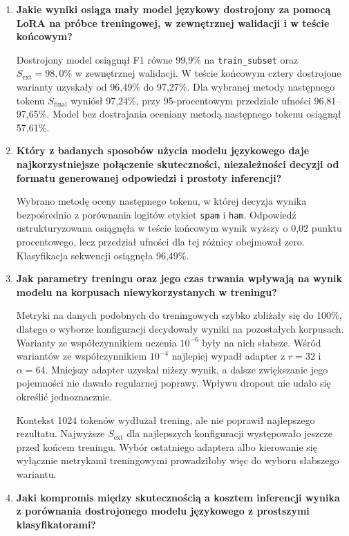 \begin{enumerate}
    \item \textbf{Jakie wyniki osiąga mały model językowy dostrojony za pomocą
    LoRA na próbce treningowej, w zewnętrznej walidacji i w teście końcowym?}

    Dostrojony model osiągnął F1 równe 99,9\% na \texttt{train\_subset} oraz
    \(S_{\mathrm{ext}}=98{,}0\%\) w zewnętrznej walidacji. W teście końcowym
    cztery dostrojone warianty uzyskały od 96,49\% do 97,27\%. Dla wybranej
    metody następnego tokenu \(S_{\mathrm{final}}\) wyniósł 97,24\%, przy
    95-procentowym przedziale ufności 96,81--97,65\%. Model bez dostrajania
    oceniany metodą następnego tokenu osiągnął 57,61\%.

    \item \textbf{Który z badanych sposobów użycia modelu językowego daje
    najkorzystniejsze połączenie skuteczności, niezależności decyzji od formatu
    generowanej odpowiedzi i prostoty inferencji?}

    Wybrano metodę oceny następnego tokenu, w której decyzja wynika bezpośrednio
    z porównania logitów etykiet \texttt{spam} i \texttt{ham}. Odpowiedź
    ustrukturyzowana osiągnęła w teście końcowym wynik wyższy o 0,02 punktu
    procentowego, lecz przedział ufności dla tej różnicy obejmował zero.
    Klasyfikacja sekwencji osiągnęła 96,49\%.

    \item \textbf{Jak parametry treningu oraz jego czas trwania wpływają
    na wynik modelu na korpusach niewykorzystanych w treningu?}

    Metryki na danych podobnych do treningowych szybko zbliżały się do 100\%,
    dlatego o wyborze konfiguracji decydowały wyniki na pozostałych korpusach.
    Warianty ze współczynnikiem uczenia \(10^{-6}\) były na nich słabsze. Wśród
    wariantów ze współczynnikiem \(10^{-4}\) najlepiej wypadł adapter z
    \(r=32\) i \(\alpha=64\). Mniejszy adapter uzyskał niższy wynik, a dalsze
    zwiększanie jego pojemności nie dawało regularnej poprawy. Wpływu dropout
    nie udało się określić jednoznacznie.

    Kontekst 1024 tokenów wydłużał trening, ale nie poprawił najlepszego
    rezultatu. Najwyższe \(S_{\mathrm{ext}}\) dla najlepszych konfiguracji
    występowało jeszcze przed końcem treningu. Wybór ostatniego adaptera albo
    kierowanie się wyłącznie metrykami treningowymi prowadziłoby więc do wyboru
    słabszego wariantu.

    \item \textbf{Jaki kompromis między skutecznością a kosztem inferencji
    wynika z porównania dostrojonego modelu językowego z prostszymi
    klasyfikatorami?}


\end{enumerate}
